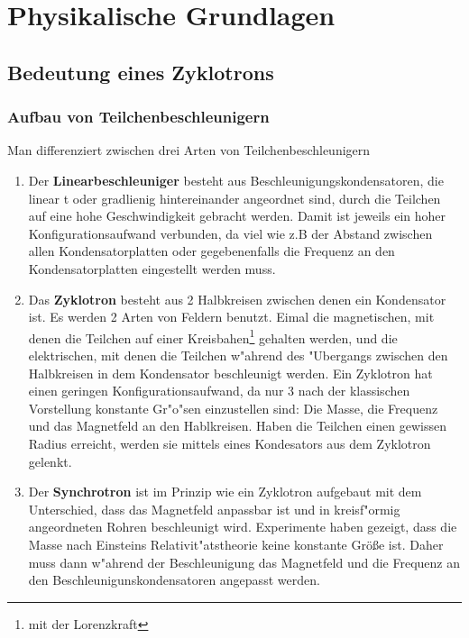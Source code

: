 \documentclass[14pt, a4paper]{report}
\begin{document}
\part{Physikalische Grundlagen}
\chapter{Bedeutung eines Zyklotrons}
\section{Aufbau von Teilchenbeschleunigern}
Man differenziert zwischen drei Arten von Teilchenbeschleunigern \footnotemark
{}
\begin{enumerate}
\item
Der \textbf{Linearbeschleuniger} besteht aus Beschleunigungskondensatoren, die linear
t oder gradlienig hintereinander angeordnet sind, durch die
Teilchen auf eine hohe Geschwindigkeit gebracht werden. Damit ist jeweils ein hoher
Konfigurationsaufwand verbunden, da viel wie z.B der Abstand zwischen allen
Kondensatorplatten oder gegebenenfalls die Frequenz an den Kondensatorplatten 
eingestellt werden muss.
\item \label{ZyklotronBeschreibungAufbau}
Das \textbf{Zyklotron} besteht aus 2 Halbkreisen zwischen denen ein Kondensator ist.
Es werden 2 Arten von Feldern benutzt. Eimal die magnetischen, mit denen die 
Teilchen auf einer Kreisbahen\footnote{mit der Lorenzkraft}
gehalten werden, und die elektrischen, 
mit denen die Teilchen w"ahrend des "Ubergangs zwischen den Halbkreisen in dem 
Kondensator beschleunigt werden. Ein Zyklotron hat einen geringen 
Konfigurationsaufwand, da nur 3 nach der klassischen Vorstellung konstante Gr"o"sen
einzustellen sind: Die Masse, die Frequenz und das Magnetfeld an den Hablkreisen. 
Haben die Teilchen einen gewissen Radius erreicht, werden sie mittels eines Kondesators
aus dem Zyklotron gelenkt.
\item
Der \textbf{Synchrotron} ist im Prinzip wie ein Zyklotron aufgebaut mit dem 
Unterschied, dass das Magnetfeld anpassbar ist und in kreisf"ormig angeordneten Rohren 
beschleunigt wird. Experimente haben gezeigt, dass die
Masse nach Einsteins Relativit"atstheorie keine konstante Größe ist. Daher muss 
dann w"ahrend der Beschleunigung das Magnetfeld und die Frequenz an den 
Beschleunigunskondensatoren angepasst werden. \label{synchrotron}
\end{enumerate}
\end{document}
